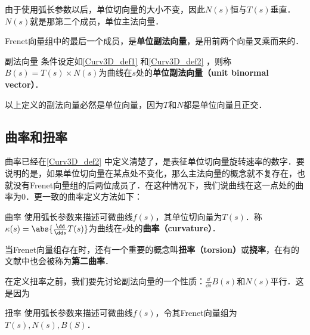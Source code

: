 由于使用弧长参数以后，单位切向量的大小不变，因此$N(s)$恒与$T(s)$垂直．$N(s)$就是那第二个成员，单位主法向量．

Frenet向量组中的最后一个成员，是\textbf{单位副法向量}，是用前两个向量叉乘而来的．

\begin{definition}{副法向量}
条件设定如\autoref{Curv3D_def1} 和\autoref{Curv3D_def2} ，则称$B(s)=T(s)\times N(s)$为曲线在$s$处的\textbf{单位副法向量（unit binormal vector）}．
\end{definition}

以上定义的副法向量必然是单位向量，因为$T$和$N$都是单位向量且正交．

\subsection{曲率和扭率}

曲率已经在\autoref{Curv3D_def2} 中定义清楚了，是表征单位切向量旋转速率的数字．要说明的是，如果单位切向量在某点处不变化，那么主法向量的概念就不复存在，也就没有Frenet向量组的后两位成员了．在这种情况下，我们说曲线在这一点处的曲率为$0$．更一致的曲率定义方法如下：

\begin{definition}{曲率}
使用弧长参数来描述可微曲线$f(s)$，其单位切向量为$T(s)$．称$\kappa(s)=\abs{\frac{\dd}{\dd s}T(s)}$为曲线在$s$处的\textbf{曲率（curvature）}．
\end{definition}

当Frenet向量组存在时，还有一个重要的概念叫\textbf{扭率（torsion）}或\textbf{挠率}，在有的文献中也会被称为\textbf{第二曲率}．

在定义扭率之前，我们要先讨论副法向量的一个性质：$\frac{\dd}{\dd s}B(s)$和$N(s)$平行．这是因为

\begin{definition}{扭率}
使用弧长参数来描述可微曲线$f(s)$，令其Frenet向量组为$T(s), N(s), B(S)$．
\end{definition}






